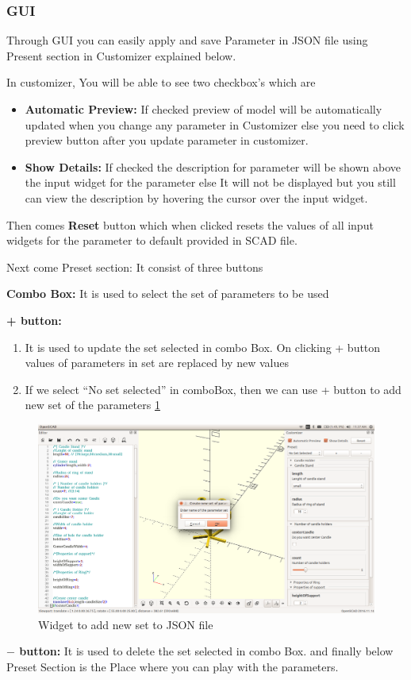 \subsubsection{GUI}

Through GUI you can easily apply and save Parameter in JSON file using Present section in Customizer explained below. 

In customizer, You will be able to see two checkbox’s which are
\begin{itemize}
\item \textbf{Automatic Preview:}
If checked preview of model will be automatically updated when you change any parameter in Customizer else you need to click preview button after you update parameter in customizer.
\item \textbf{Show Details:}
If checked the description for parameter will be shown above the input widget for the parameter else It will not be displayed but you still can view the description by hovering the cursor over the input widget.
\end{itemize}
Then comes \textbf{Reset} button which when clicked resets the values of all input widgets for the parameter to default provided in SCAD file.

Next come Preset section: It consist of three buttons
\begin{description}
	\item \textbf{Combo Box:}
		It is used to select the set of parameters to be used
	\item \textbf{+ button:}
	\begin{enumerate}
		\item It is used to update the set selected in combo Box. On clicking + button values of parameters in set are replaced by new values
		\item If we select “No set selected” in comboBox, then we can use + button to add new set of the parameters \ref{fig:Add new set}
	\end{enumerate}
	\begin{figure}[H] 
		\centering \includegraphics[scale=0.31]{images/output/7.png}
		\caption{Widget to add new set to JSON file}
		\label{fig:Add new set}
	\end{figure}

	\item \textbf{$-$ button: }
		It is used to delete the set selected in combo Box.
	and finally below Preset Section is the Place where you can play with the parameters.
\end{description}


